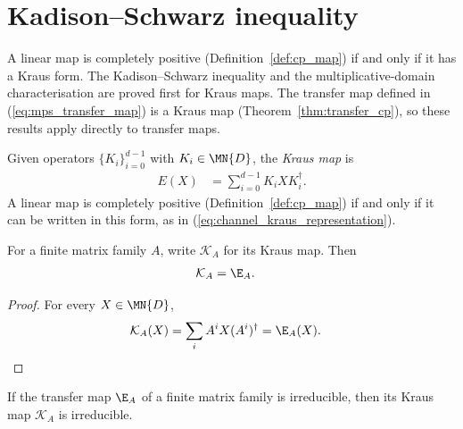 \section{Kadison--Schwarz inequality}

A linear map is completely positive (Definition~\ref{def:cp_map}) if and only
if it has a Kraus form. The Kadison--Schwarz inequality and the
multiplicative-domain characterisation are proved first for Kraus maps.
The transfer map defined in (\ref{eq:mps_transfer_map}) is a Kraus map
(Theorem~\ref{thm:transfer_cp}), so these results apply directly to transfer
maps.

\begin{definition}\label{def:kraus_map}
    \leanok
    Given operators $\{K_i\}_{i=0}^{d-1}$ with $K_i \in \MN{D}$,
    the \emph{Kraus map} is
    \begin{align}
        E(X)
        &= \sum_{i=0}^{d-1} K_i X K_i^\dagger.
        \label{eq:schwarz_kraus_map}
    \end{align}
    A linear map is completely positive
    (Definition~\ref{def:cp_map}) if and only if it can be written in this
    form, as in (\ref{eq:channel_kraus_representation}).
\end{definition}

\begin{theorem}
    \label{thm:kraus_map_eq_transfer_map}
    \leanok
    For a finite matrix family $A$, write $\mathcal K_A$ for its Kraus map.
    Then
    \begin{align}
        \mathcal K_A
         & =\E_A.
        \notag
    \end{align}
\end{theorem}

\begin{proof}
    \leanok
    For every $X\in\MN{D}$,
    \begin{align}
        \mathcal K_A(X)
         & =\sum_i A^iX(A^i)^\dagger
          =\E_A(X).
        \notag
    \end{align}
\end{proof}

\begin{theorem}
    \label{thm:kraus_map_irreducible_of_transfer_map}
    \leanok
    If the transfer map $\E_A$ of a finite matrix family is irreducible, then
    its Kraus map $\mathcal K_A$ is irreducible.
\end{theorem}

